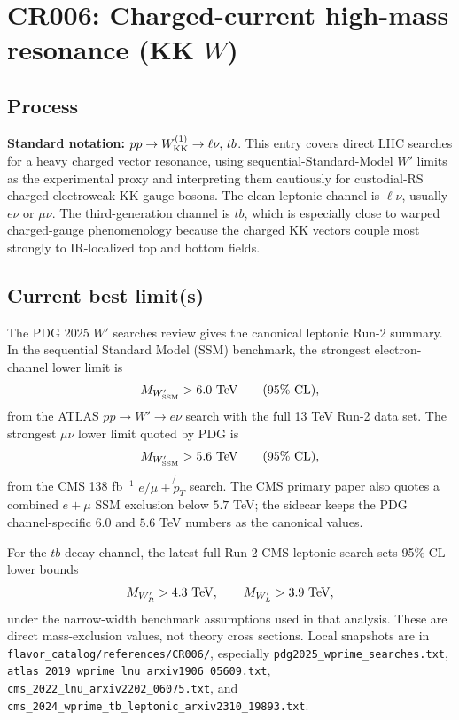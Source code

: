 
\section{CR006: Charged-current high-mass resonance (KK \(W\))}

\subsection*{Process}
\textbf{Standard notation:} \(pp \to W^{(1)}_{\rm KK} \to \ell\nu,\,tb\).
This entry covers direct LHC searches for a heavy charged vector resonance,
using sequential-Standard-Model \(W'\) limits as the experimental proxy and
interpreting them cautiously for custodial-RS charged electroweak KK gauge
bosons.  The clean leptonic channel is \(\ell\nu\), usually \(e\nu\) or
\(\mu\nu\).  The third-generation channel is \(tb\), which is especially close
to warped charged-gauge phenomenology because the charged KK vectors couple
most strongly to IR-localized top and bottom fields.

\subsection*{Current best limit(s)}
The PDG 2025 \(W'\) searches review gives the canonical leptonic Run-2
summary.  In the sequential Standard Model (SSM) benchmark, the strongest
electron-channel lower limit is
\[
  M_{W'_{\rm SSM}} > 6.0~{\rm TeV}
  \qquad (95\%~{\rm CL}),
\]
from the ATLAS \(pp\to W'\to e\nu\) search with the full 13 TeV Run-2 data
set.  The strongest \(\mu\nu\) lower limit quoted by PDG is
\[
  M_{W'_{\rm SSM}} > 5.6~{\rm TeV}
  \qquad (95\%~{\rm CL}),
\]
from the CMS 138 fb\(^{-1}\) \(e/\mu+\not{p}_T\) search.  The CMS primary
paper also quotes a combined \(e+\mu\) SSM exclusion below \(5.7\) TeV; the
sidecar keeps the PDG channel-specific \(6.0\) and \(5.6\) TeV numbers as the
canonical values.

For the \(tb\) decay channel, the latest full-Run-2 CMS leptonic search sets
95\% CL lower bounds
\[
  M_{W'_R} > 4.3~{\rm TeV}, \qquad
  M_{W'_L} > 3.9~{\rm TeV},
\]
under the narrow-width benchmark assumptions used in that analysis.  These
are direct mass-exclusion values, not theory cross sections.  Local snapshots
are in \texttt{flavor\_catalog/references/CR006/}, especially
\texttt{pdg2025\_wprime\_searches.txt},
\texttt{atlas\_2019\_wprime\_lnu\_arxiv1906\_05609.txt},
\texttt{cms\_2022\_lnu\_arxiv2202\_06075.txt}, and
\texttt{cms\_2024\_wprime\_tb\_leptonic\_arxiv2310\_19893.txt}.

